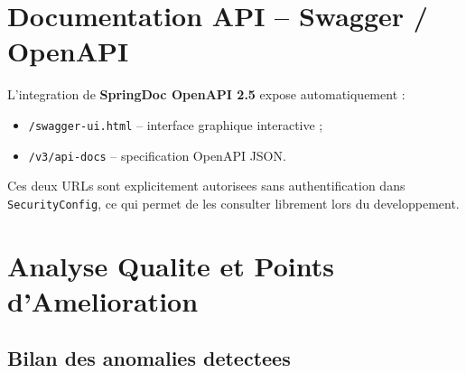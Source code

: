 \documentclass[12pt,a4paper]{report}
\begin{document}
\chapter{Documentation API -- Swagger / OpenAPI}

L'integration de \textbf{SpringDoc OpenAPI 2.5} expose automatiquement :
\begin{itemize}
    \item \texttt{/swagger-ui.html} -- interface graphique interactive ;
    \item \texttt{/v3/api-docs}     -- specification OpenAPI JSON.
\end{itemize}
Ces deux URLs sont explicitement autorisees sans authentification dans
\texttt{SecurityConfig}, ce qui permet de les consulter librement lors du
developpement.

\chapter{Analyse Qualite et Points d'Amelioration}

\section{Bilan des anomalies detectees}
\end{document}
